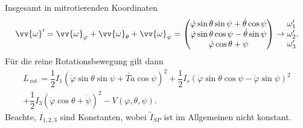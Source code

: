 \documentclass[a4paper,12pt]{article}
\numberwithin{equation}{section}
\begin{document}
Insgesamt in mitrotierenden Koordinaten
\[ 
        \vv{\omega }'=\vv{\omega }_\varphi +\vv{\omega }_\theta +\vv{\omega }_\psi =\begin{pmatrix}
                \dot{\varphi }\sin \theta \sin \psi +\dot{\theta }\cos \psi \\
                \dot{\varphi }\sin \theta \cos \psi -\dot{\theta }\sin \psi \\
                \dot{\varphi }\cos \theta +\psi 
        \end{pmatrix}\rightarrow \begin{matrix}
                \omega _1'\\\omega _2'\\\omega _3'
        \end{matrix}
.\] 
Für die reine Rotationsbewegung gilt dann
\begin{multline*}
        L_{\,\text{rot}\,}=\dfrac{1}{2}I_1\left(\dot{\varphi }\sin \theta \sin \psi +\dot{Ta}\cos \psi \right)^2+\dfrac{1}{2}I_s\left(\dot{\varphi }\sin \theta \cos \psi -\dot{\varphi }\sin \psi \right)^2\\+\dfrac{1}{2}I_3\left(\dot{\varphi }\cos \theta +\dot{\psi }\right)^2-V\left(\varphi ,\theta ,\psi \right)
.\end{multline*}
Beachte, $I_{1,2,3}$ sind Konstanten, wobei $\overleftrightarrow{I}_{SP}$ ist im Allgemeinen nicht konstant.
\end{document}
